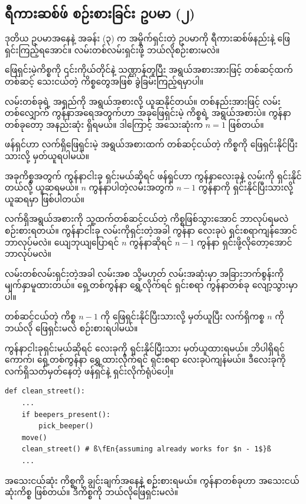 \subsection*{ရီကားဆစ်ဖ် စဉ်းစားခြင်း ဥပမာ (၂)}
ဒုတိယ ဥပမာအနေနဲ့ အခန်း (၃) က အမှိုက်ရှင်းတဲ့ ဥပမာကို ရီကားဆစ်ဖ်နည်းနဲ့ ဖြေရှင်းကြည့်ရအောင်။ လမ်းတစ်လမ်းရှင်းဖို့ ဘယ်လိုစဉ်းစားမလဲ။
\begin{mytcbox}
ဖြေရှင်းမဲ့ကိစ္စကို ၎င်းကိုယ်တိုင်နဲ့ သဏ္ဌာန်တူပြီး အရွယ်အစားအားဖြင့် တစ်ဆင့်ထက်တစ်ဆင့် သေးငယ်တဲ့ ကိစ္စတွေအဖြစ် ခွဲခြမ်းကြည့်ရမှာပါ။
\end{mytcbox}%

လမ်းတစ်ခုရဲ့ အရှည်ကို အရွယ်အစားလို့ ယူဆနိုင်တယ်။ တစ်နည်းအားဖြင့် လမ်းတစ်လျှောက် ကွန်နာအရေအတွက်ဟာ အခုဖြေရှင်းမဲ့ ကိစ္စရဲ့ အရွယ်အစားပဲ။ ကွန်နာတစ်ခုတော့ အနည်းဆုံး ရှိရမယ်။ ဒါကြောင့် အသေးဆုံးက $n = 1$ ဖြစ်တယ်။

\begin{mytcbox}
 ဖန်ရှင်ဟာ လက်ရှိဖြေရှင်းမဲ့ အရွယ်အစားထက် တစ်ဆင့်ငယ်တဲ့ ကိစ္စကို ဖြေရှင်းနိုင်ပြီးသားလို့ မှတ်ယူရပါမယ်။ 
\end{mytcbox}%

အခုကိစ္စအတွက် ကွန်နာငါးခု ရှင်းမယ်ဆိုရင်  ဖန်ရှင်ဟာ ကွန်နာလေးခုနဲ့ လမ်းကို ရှင်းနိုင်တယ်လို့ ယူဆရမယ်။  $n$ ကွန်နာပါတဲ့လမ်းအတွက် $n - 1$ ကွန်နာကို ရှင်းနိုင်ပြီးသားလို့ ယူဆရမှာ ဖြစ်ပါတယ်။


\begin{mytcbox}
လက်ရှိအရွယ်အစားကို သူ့ထက်တစ်ဆင့်ငယ်တဲ့ ကိစ္စဖြစ်သွားအောင် ဘာလုပ်ရမလဲ စဉ်းစားရတယ်။ ကွန်နာငါးခု လမ်းကိုရှင်းတဲ့အခါ ကွန်နာ လေးခုပဲ ရှင်းစရာကျန်အောင် ဘာလုပ်မလဲ။ ယျေဘုယျပြောရင် $n$ ကွန်နာဆိုရင် $n - 1$ ကွန်နာ ရှင်းဖို့လိုတော့အောင် ဘာလုပ်မလဲ။ 
\end{mytcbox}%

လမ်းတစ်လမ်းရှင်းတဲ့အခါ လမ်းအစ သို့မဟုတ် လမ်းအဆုံးမှာ အခြားဘက်စွန်းကို  မျက်နှာမူထားတယ်။ ရှေ့တစ်ကွန်နာ ရွှေ့လိုက်ရင်  ရှင်းစရာ ကွန်နာတစ်ခု လျော့သွားမှာပါ။

\begin{mytcbox}
တစ်ဆင့်ငယ်တဲ့ ကိစ္စ $n - 1$ ကို ဖြေရှင်းနိုင်ပြီးသားလို့ မှတ်ယူပြီး လက်ရှိကစ္စ $n$ ကို ဘယ်လို ဖြေရှင်းမလဲ စဉ်းစားရပါမယ်။
\end{mytcbox}%

ကွန်နာငါးခုရှင်းမယ်ဆိုရင် လေးခုကို ရှင်းနိုင်ပြီးသား မှတ်ယူထားရမယ်။ ဘိပါရှိရင်ကောက်၊ ရှေ့တစ်ကွန်နာ ရွှေ့ထားလိုက်ရင် ရှင်းစရာ လေးခုပဲကျန်မယ်။ ဒီလေးခုကို လက်ရှိသတ်မှတ်နေတဲ့ ဖန်ရှင်နဲ့ ရှင်းလိုက်ရုံပဲပေါ့။
%
\setlength{\fboxsep}{0pt}
\begin{verbatim}
def clean_street():
    ...
    if beepers_present():
        pick_beeper()
    move()
    clean_street() # ‌ß\fEn{assuming already works for $n - 1$}ß
    ...
\end{verbatim}
%
\begin{mytcbox}
    အသေးငယ်ဆုံး ကိစ္စကို ချွင်းချက်အနေနဲ့ စဉ်းစားရမယ်။   ကွန်နာတစ်ခုဟာ အသေးငယ်ဆုံးကိစ္စ ဖြစ်တယ်။ ဒီကိစ္စကို ဘယ်လိုဖြေရှင်းမလဲ။
\end{mytcbox}

